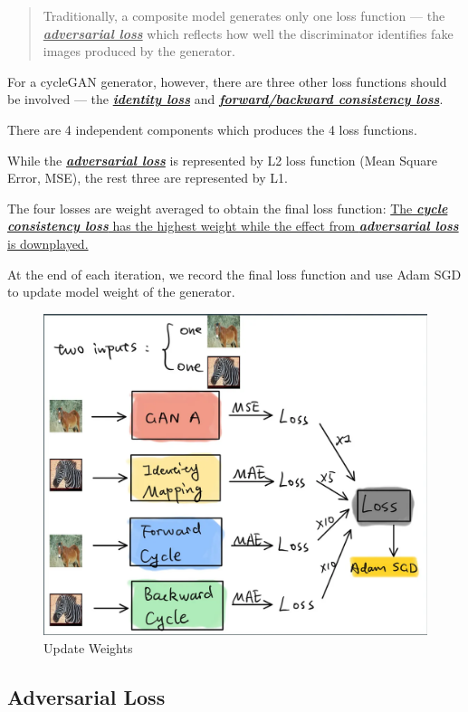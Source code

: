 \documentclass[
]{article}
\begin{document}
\begin{quote}
Traditionally, a composite model generates only one loss function ---
the \uline{\emph{\textbf{adversarial loss}}} which reflects how well the
discriminator identifies fake images produced by the generator.
\end{quote}

For a cycleGAN generator, however, there are three other loss functions
should be involved --- the \uline{\emph{\textbf{identity loss}}} and
\uline{\emph{\textbf{forward/backward consistency loss}}}.

There are 4 independent components which produces the 4 loss functions.

While the \uline{\emph{\textbf{adversarial loss}}} is represented by L2
loss function (Mean Square Error, MSE), the rest three are represented
by L1.

The four losses are weight averaged to obtain the final loss function:
\uline{The \emph{\textbf{cycle consistency loss}} has the highest weight
while the effect from \emph{\textbf{adversarial loss}} is downplayed.}

At the end of each iteration, we record the final loss function and use
Adam SGD to update model weight of the generator.

\begin{figure}
\centering
\includegraphics{./assets/Update_Weights.png}
\caption{Update Weights}
\end{figure}

\hypertarget{adversarial-loss}{%
\subsection{Adversarial Loss}\label{adversarial-loss}}
\end{document}
